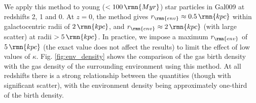 \documentclass[fleqn,usenatbib]{mnras}
\newcommand\Myr{\,\rmn{Myr}}
\newcommand\kpc{\,\rmn{kpc}}
\begin{document}
We apply this method to young ($<100 \Myr$) star particles in Gal009 at redshifts 2, 1 and 0. At $z=0$, the method gives $r_\rmn{env} \approx 0.5 \kpc$ within galactocentric radii of $2 \kpc$, and $r_\rmn{env} \approx 2 \kpc$ (with large scatter) at radii $>5 \kpc$. In practice, we impose a maximum $r_\rmn{env}$ of $5 \kpc$ (the exact value does not affect the results) to limit the effect of low values of $\kappa$.
Fig. \ref{fig:env_density} shows the comparison of the gas birth density with the gas density of the surrounding environment using this method. At all redshifts there is a strong relationship between the quantities (though with significant scatter), with the environment density being approximately one-third of the birth density. 





\bsp	%
\label{lastpage}
\end{document}
